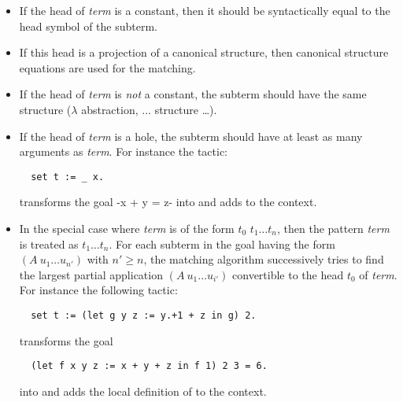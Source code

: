 \begin{itemize}
\item If the head of \textit{term} is a constant, then it
  should be syntactically equal to the head symbol of the subterm.
\item If this head is a projection of a canonical structure,
  then canonical structure equations are used for the matching.
\item If the head of \textit{term} is \emph{not} a constant, the
  subterm should have the same structure ($\lambda$ abstraction,
  $\dots$ structure \dots).
\item If the head of \textit{term} is a hole, the subterm should have
  at least as many arguments as  \textit{term}. For instance the tactic:
\begin{lstlisting}
  set t := _ x.
\end{lstlisting}
transforms the goal \ssrL-x + y = z- into  and adds
 to the context.

\item In the special case where \textit{term} is of the form
  $t_0$ $t_1\dots t_n$,
 then the pattern \textit{term} is treated
as \ssrC{(_ }$t_1\dots t_n$\ssrC{)}. For each subterm in
the goal having the form $(A\  u_1\dots u_{n'})$ with $n' \geq n$, the
matching algorithm successively tries to find the largest
partial application $(A\ u_1\dots u_{i'})$ convertible to the head
$t_0$ of \textit{term}. For instance the following tactic:
\begin{lstlisting}
  set t := (let g y z := y.+1 + z in g) 2.
\end{lstlisting}
transforms the goal
\begin{lstlisting}
  (let f x y z := x + y + z in f 1) 2 3 = 6.
\end{lstlisting}
into  and adds the local definition of  to the
context.
\end{itemize}


